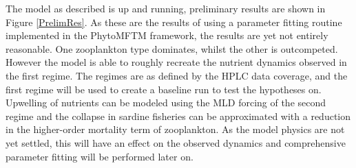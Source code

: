 The model as described is up and running, preliminary results are shown in Figure \ref{PrelimRes}. 
As these are the results of using a parameter fitting routine implemented in the PhytoMFTM framework, the results are yet not entirely reasonable. One zooplankton type dominates, whilst the other is outcompeted. However the model is able to roughly recreate the nutrient dynamics observed in the first regime. The regimes are as defined by the HPLC data coverage, and the first regime will be used to create a baseline run to test the hypotheses on.
 Upwelling of nutrients can be modeled using the MLD forcing of the second regime and the collapse in sardine fisheries can be approximated with a reduction in the higher-order mortality term of zooplankton. 
 As the model physics are not yet settled, this will have an effect on the observed dynamics and comprehensive parameter fitting will be performed later on. 

